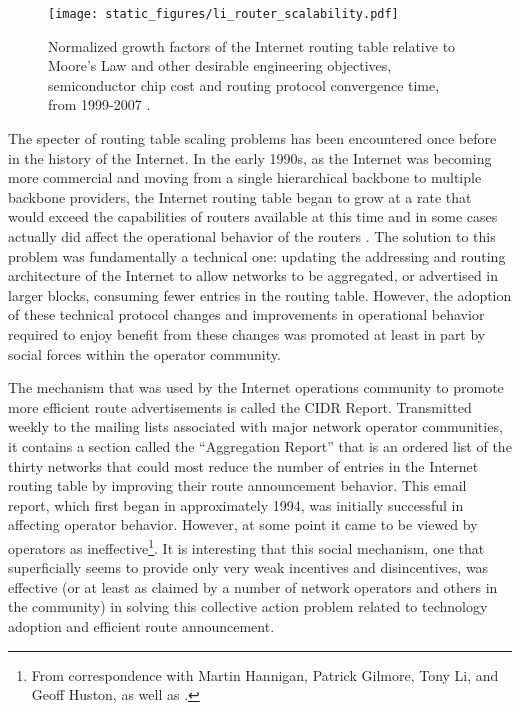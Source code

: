 \begin{figure}
\begin{centering}
    \texttt{[image: static\_figures/li\_router\_scalability.pdf]}
    \caption[Normalized growth factors of the Internet routing table relative to Moore's Law]{Normalized growth factors of the Internet routing table relative to Moore's Law and other desirable engineering objectives, semiconductor chip cost and routing protocol convergence time, from 1999-2007 \cite{Li:2006cr}.}
    \label{fig:li_router_scalability}
\end{centering}
\end{figure}

The specter of routing table scaling problems has been encountered once before in the history of the Internet. In the early 1990s, as the Internet was becoming more commercial and moving from a single hierarchical backbone to multiple backbone providers, the Internet routing table began to grow at a rate that would exceed the capabilities of routers available at this time \cite{Huston:2001bs} and in some cases actually did affect the operational behavior of the routers \cite{Li:2011vn}. The solution to this problem was fundamentally a technical one: updating the addressing and routing architecture of the Internet to allow networks to be aggregated, or advertised in larger blocks, consuming fewer entries in the routing table. However, the adoption of these technical protocol changes and improvements in operational behavior required to enjoy benefit from these changes was promoted at least in part by social forces within the operator community. 

The mechanism that was used by the Internet operations community to promote more efficient route advertisements is called the CIDR Report. Transmitted weekly to the mailing lists associated with major network operator communities, it contains a section called the ``Aggregation Report'' that is an ordered list of the thirty networks that could most reduce the number of entries in the Internet routing table by improving their route announcement behavior. This email report, which first began in approximately 1994, was initially successful in affecting operator behavior. However, at some point it came to be viewed by operators as ineffective\footnote{From correspondence with Martin Hannigan, Patrick Gilmore, Tony Li, and Geoff Huston, as well as \cite{Steenbergen:2010nx}.}. It is interesting that this social mechanism, one that superficially seems to provide only very weak incentives and disincentives, was effective (or at least as claimed by a number of network operators and others in the community) in solving this collective action problem related to technology adoption and efficient route announcement.

